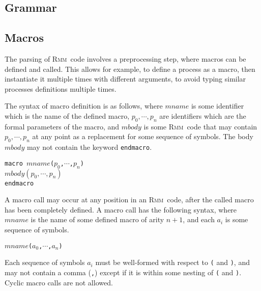 \documentclass[a4paper]{article}
\newcommand{\rmm}{\textsc{Rmm}}
\begin{document}
\subsection{Grammar}



\subsection{Macros}

The parsing of \rmm\ code involves a preprocessing step, where macros
can be defined and called. This allows for example, to define a
process as a macro, then instantiate it multiple times with different
arguments, to avoid typing similar processes definitions multiple
times.

The syntax of macro definition is as follows, where $mname$ is some
identifier which is the name of the defined macro, $p_0,\cdots,p_n$
are identifiers which are the formal parameters of the macro, and
$mbody$ is some \rmm\ code that may contain $p_0,\cdots,p_n$ at any
point as a replacement for some sequence of symbols. The body $mbody$
may not contain the keyword {\tt endmacro}.

\vspace{15pt}

\noindent
{\tt macro }$mname${\tt (}$p_0${\tt ,}$\cdots${\tt ,}$p_n${\tt)}\\
$mbody(p_0,\cdots,p_n)$\\
{\tt endmacro}\\

\vspace{15pt}

A macro call may occur at any position in an \rmm\ code, after the
called macro has been completely defined. A macro call has the
following syntax, where $mname$ is the name of some defined macro of
arity $n+1$, and each $a_i$ is some sequence of symbols.

\vspace{15pt}

\noindent
$mname${\tt (}$a_0${\tt ,}$\cdots${\tt ,}$a_n${\tt )}\\

\vspace{15pt}

Each sequence of symbols $a_i$ must be well-formed with respect to
{\tt (} and {\tt )}, and may not contain a comma ({\tt ,}) except if
it is within some nesting of {\tt (} and {\tt )}. Cyclic macro calls
are not allowed.
\end{document}
